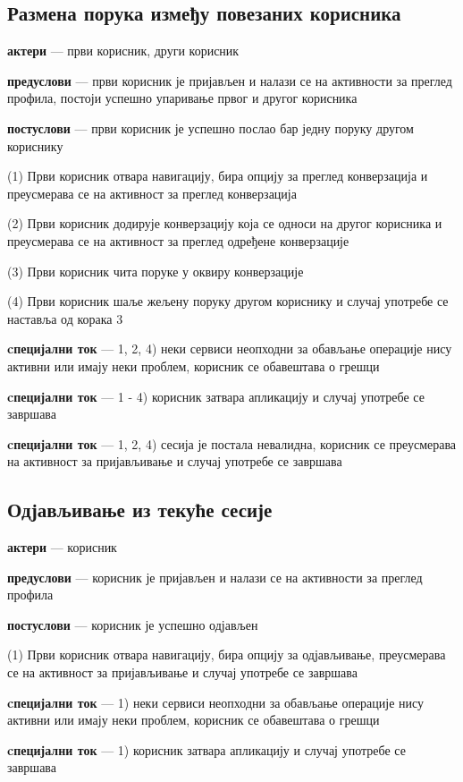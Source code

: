 \documentclass[12pt,oneside]{memoir}
\begin{document}
\subsection{Размена порука између повезаних корисника}
\begin{description}
    \item \textbf{актери} --- први корисник, други корисник
    \item \textbf{предуслови} --- први корисник је пријављен и налази се на активности за преглед профила, постоји успешно упаривање првог и другог корисника
    \item \textbf{постуслови} --- први корисник је успешно послао бар једну поруку другом кориснику
    \item (1) Први корисник отвара навигацију, бира опцију за преглед конверзација и преусмерава се на активност за преглед конверзација
    \item (2) Први корисник додирује конверзацију која се односи на другог корисника и преусмерава се на активност за преглед одређене конверзације
    \item (3) Први корисник чита поруке у оквиру конверзације
    \item (4) Први корисник шаље жељену поруку другом кориснику и случај употребе се наставља од корака 3
    \item \textbf{cпецијални ток} --- 1, 2, 4) неки сервиси неопходни за обављање операције нису активни или имају неки проблем, корисник се обавештава о грешци
    \item \textbf{cпецијални ток} --- 1 - 4) корисник затвара апликацију и случај употребе се завршава
    \item \textbf{cпецијални ток} --- 1, 2, 4) сесија је постала невалидна, корисник се преусмерава на активност за пријављивање и случај употребе се завршава
\end{description}

\subsection{Одјављивање из текуће сесије}
\begin{description}
    \item \textbf{актери} --- корисник
    \item \textbf{предуслови} --- корисник је пријављен и налази се на активности за преглед профила
    \item \textbf{постуслови} --- корисник је успешно одјављен
    \item (1) Први корисник отвара навигацију, бира опцију за одјављивање, преусмерава се на активност за пријављивање и случај употребе се завршава
    \item \textbf{cпецијални ток} --- 1) неки сервиси неопходни за обављање операције нису активни или имају неки проблем, корисник се обавештава о грешци
    \item \textbf{cпецијални ток} --- 1) корисник затвара апликацију и случај употребе се завршава
\end{description}
\end{document}
